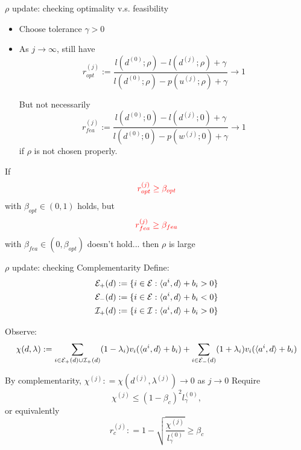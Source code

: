\documentclass[8pt]{beamer}
\begin{document}
	\begin{frame}{$\rho$ update: checking optimality v.s. feasibility}
		\begin{itemize}
			\item   Choose tolerance $\gamma>0$
			\item  As $j\to \infty$, still have 
				$$r^{(j)}_{opt} := \frac{l(d^{(0)};\rho) - l (d^{(j)};\rho) + \gamma  }{l(d^{(0)}; \rho) - p (u^{(j)};\rho) + \gamma } \to 1 $$

				But not necessarily 
				\[
					r^{(j)}_{fea} := \frac{l(d^{(0)};0) - l (d^{(j)};0) + \gamma}{l(d^{(0)}; 0)- p(w^{(j)};0) + \gamma}  \to 1
				\]
				if $\rho$ is not chosen properly. 
		\end{itemize}
		\vfill 
		If
		\[ {\color{red} r^{(j)}_{opt}  \ge \beta_{opt}} \]
		with $\beta_{opt} \in (0,1)$ holds, but  
		\[ {\color{red} r^{(j)}_{fea} \ge \beta_{fea} } \]
		with $\beta_{fea}    \in (0,\beta_{opt} )$ doesn't hold... then $\rho$ is large
		\vfill
	\end{frame}

	\begin{frame}{$\rho$ update: checking Complementarity}
		Define: 
		\[ \begin{aligned}
		{\cal E}_+(d) & := \{  i\in {\cal E}:  \langle a^i, d\rangle + b_i > 0\}\\
		{\cal E}_-(d) & := \{ i\in{\cal E}:  \langle a^i, d\rangle + b_i < 0\} \\
		{\cal I}_+(d) & := \{i \in{\cal I}: \langle a^i, d\rangle + b_i > 0\}
		\end{aligned}
		\]

		Observe: 
		\[ \chi(d,\lambda):= \sum_{i\in{\cal E}_+(d)\cup{\cal I}_+(d)} (1- \lambda_i) v_i(\langle a^i, d\rangle + b_i)  + \sum_{i\in{\cal E}_-(d)}( 1+\lambda_i)  v_i(\langle a^i, d\rangle + b_i) \]

		By complementarity,    {\blue $\chi^{(j)}: =  \chi(d^{(j)},\lambda^{(j)}) \to 0$  as $j\to 0$ }
		\vfill
		Require \[ \chi^{(j)} \le (1-\beta_c)^2 l^{(0)}_ \gamma, \] or equivalently
		{\red \[ r_c^{(j)}: =1- \sqrt{  \frac{ \chi^{(j)} }{l^{(0)}_ \gamma} } \ge \beta_c \]}
	\end{frame}
\end{document}
